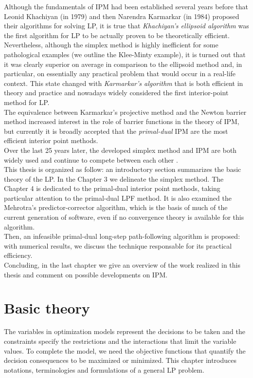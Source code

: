 \documentclass[a4paper,10 pt,titlepage,twoside]{book}
\theoremstyle{plain}
\theoremstyle{definition}
\theoremstyle{remark}
\begin{document}
Although the fundamentals of IPM had been established several years before that Leonid Khachiyan (in 1979) and then Narendra Karmarkar (in 1984) proposed their algorithms for solving LP, it is true that \textit{Khachiyan’s ellipsoid algorithm} was the first algorithm for LP to be actually proven to be theoretically efficient. Nevertheless, although the simplex method is highly inefficient for some pathological examples (we outline the Klee-Minty example), it is turned out that it was clearly superior on average in comparison to the ellipsoid method and, in particular, on essentially any practical problem that would occur in a real-life context. This state changed with \textit{Karmarkar’s algorithm} that is both efficient in theory and practice and nowadays widely considered the first interior-point method for LP.\\
The equivalence between Karmarkar's projective method and the Newton barrier method increased interest in the role of barrier functions in the theory of IPM, but currently it is broadly accepted that the \textit{primal-dual} IPM are the most efficient interior point methods.\\
Over the last 25 years later, the developed simplex method and IPM are both widely used and continue to compete between each other \cite{25y}. \\
This thesis is organized as follow: an introductory section summarizes the basic theory of the LP. In the Chapter 3 we delineate the simplex method. The Chapter 4 is dedicated to the primal-dual interior point methods, taking particular attention to the primal-dual LPF method. It is also examined the Mehrotra's predictor-corrector algorithm, which is the basis of much of the current generation of software, even if no convergence theory is available for this algorithm.\\
Then, an infeasible primal-dual long-step path-following algorithm is proposed: with numerical results, we discuss the technique responsable for its practical efficiency.\\
Concluding, in the last chapter we give an overview of the work realized in this thesis and comment on possible developments on IPM. 

%
%

\chapter{Basic theory}
The variables in optimization models represent the decisions to be taken and the constraints specify the restrictions and the interactions that limit the variable values.
To complete the model, we need the objective functions that quantify the decision consequences to be maximized or minimized. This chapter introduces notations, terminologies and formulations of a general LP problem.
\end{document}
